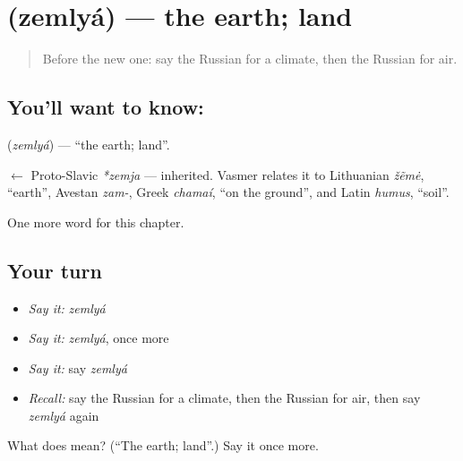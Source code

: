 \section[\texorpdfstring{\ru{земля} (zemlyá)}{земля (zemlyá)}]{ (zemlyá) — the earth; land}

\label{lesson:RU-C164-zemlya}



\begin{quote}
Before the new one: say the Russian for a climate, then the Russian for air.
\end{quote}

\subsection*{You'll want to know: }
\textbf{} (\emph{zemlyá}) — \textquotedblleft{}the earth; land\textquotedblright{}.

\begin{cousinweb}
\textbf{} $\leftarrow$ Proto-Slavic \emph{*zemja} — inherited. Vasmer relates it to Lithuanian \emph{žẽmė}, \textquotedblleft{}earth\textquotedblright{}, Avestan \emph{zam-}, Greek \emph{chamaí}, \textquotedblleft{}on the ground\textquotedblright{}, and Latin \emph{humus}, \textquotedblleft{}soil\textquotedblright{}.
\end{cousinweb}

\begin{grammarlens}[title={What you've built}]
One more word for this chapter.
\end{grammarlens}

\subsection*{Your turn}
\begin{itemize}
\raggedright
  \item \emph{Say it:} \emph{zemlyá}
  \item \emph{Say it:} \emph{zemlyá}, once more
  \item \emph{Say it:} say \emph{zemlyá}
  \item \emph{Recall:} say the Russian for a climate, then the Russian for air, then say \emph{zemlyá} again
\end{itemize}

\begin{tcolorbox}[breakable,colback=teal!4,colframe=teal!35!black,title={Before you move on}]
What does  mean? (\textquotedblleft{}The earth; land\textquotedblright{}.) Say it once more.
\end{tcolorbox}

